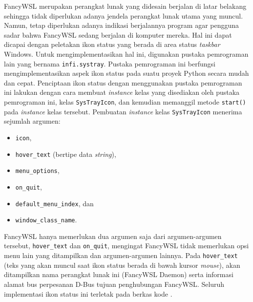 FancyWSL merupakan perangkat lunak yang didesain berjalan di latar belakang sehingga tidak diperlukan adanya jendela perangkat lunak utama yang muncul. Namun, tetap diperlukan adanya indikasi berjalannya program agar pengguna sadar bahwa FancyWSL sedang berjalan di komputer mereka. Hal ini dapat dicapai dengan peletakan ikon status yang berada di area status \textit{taskbar} Windows. Untuk mengimplementasikan hal ini, digunakan pustaka pemrograman lain yang bernama \verb|infi.systray|. Pustaka pemrograman ini berfungsi mengimplementasikan aspek ikon status pada suatu proyek Python secara mudah dan cepat. Penciptaan ikon status dengan menggunakan pustaka pemrograman ini lakukan dengan cara membuat \textit{instance} kelas yang disediakan oleh pustaka pemrograman ini, kelas \verb|SysTrayIcon|, dan kemudian memanggil metode \verb|start()| pada \textit{instance} kelas tersebut. Pembuatan \textit{instance} kelas \verb|SysTrayIcon| menerima sejumlah argumen:
\begin{itemize}
    \item \verb|icon|,
    \item \verb|hover_text| (bertipe data \textit{string}),
    \item \verb|menu_options|,
    \item \verb|on_quit|,
    \item \verb|default_menu_index|, dan
    \item \verb|window_class_name|.
\end{itemize}
FancyWSL hanya memerlukan dua argumen saja dari argumen-argumen tersebut, \verb|hover_text| dan \verb|on_quit|, mengingat FancyWSL tidak memerlukan opsi menu lain yang ditampilkan dan argumen-argumen lainnya. Pada \verb|hover_text| (teks yang akan muncul saat ikon status berada di bawah kursor \textit{mouse}), akan ditampilkan nama perangkat lunak ini (FancyWSL Daemon) serta informasi alamat bus perpesanan D-Bus tujuan penghubungan FancyWSL. Seluruh implementasi ikon status ini terletak pada berkas kode .

